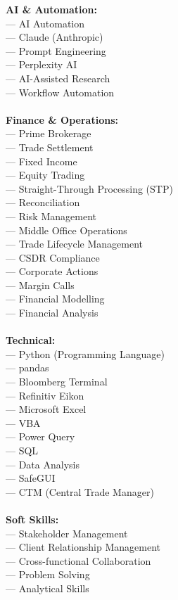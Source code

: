\documentclass[11pt,a4paper]{article}
\begin{document}
\begin{copybox}
\textbf{AI \& Automation:}\\
--- AI Automation\\
--- Claude (Anthropic)\\
--- Prompt Engineering\\
--- Perplexity AI\\
--- AI-Assisted Research\\
--- Workflow Automation\\
\\
\textbf{Finance \& Operations:}\\
--- Prime Brokerage\\
--- Trade Settlement\\
--- Fixed Income\\
--- Equity Trading\\
--- Straight-Through Processing (STP)\\
--- Reconciliation\\
--- Risk Management\\
--- Middle Office Operations\\
--- Trade Lifecycle Management\\
--- CSDR Compliance\\
--- Corporate Actions\\
--- Margin Calls\\
--- Financial Modelling\\
--- Financial Analysis\\
\\
\textbf{Technical:}\\
--- Python (Programming Language)\\
--- pandas\\
--- Bloomberg Terminal\\
--- Refinitiv Eikon\\
--- Microsoft Excel\\
--- VBA\\
--- Power Query\\
--- SQL\\
--- Data Analysis\\
--- SafeGUI\\
--- CTM (Central Trade Manager)\\
\\
\textbf{Soft Skills:}\\
--- Stakeholder Management\\
--- Client Relationship Management\\
--- Cross-functional Collaboration\\
--- Problem Solving\\
--- Analytical Skills
\end{copybox}
\end{document}

